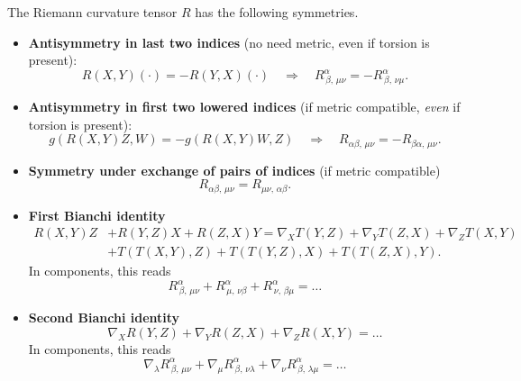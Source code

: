 \begin{mytheorem}
The Riemann curvature tensor \(R\) has the following symmetries.
\begin{itemize}
    \item \textbf{Antisymmetry in last two indices} (no need metric, even if torsion is present):
    \begin{equation}
        R(X,Y)(\cdot) = - R(Y,X)(\cdot) \quad \Longrightarrow \quad
        R^\alpha_{\,\beta,\, \mu\nu} = - R^\alpha_{\,\beta,\, \nu\mu}.
    \end{equation}
    \item \textbf{Antisymmetry in first two lowered indices} (if metric compatible, \emph{even} if torsion is present):
    \begin{equation}
        g(R(X,Y)Z,W) = - g(R(X,Y)W,Z) \quad \Longrightarrow \quad
        R_{\alpha \beta,\, \mu\nu} = - R_{\beta \alpha,\, \mu\nu}.
    \end{equation}
    \item \textbf{Symmetry under exchange of pairs of indices} (if metric compatible) 
    \begin{equation}
        R_{\alpha \beta,\, \mu\nu} = R_{\mu \nu,\, \alpha \beta}.
    \end{equation}
    \item \textbf{First Bianchi identity}
    \begin{align}
        R(X,Y)Z& + R(Y,Z)X + R(Z,X)Y = \nabla_X T(Y,Z) + \nabla_Y T(Z,X) + \nabla_Z T(X,Y) \\
        & + T(T(X,Y),Z) + T(T(Y,Z),X) + T(T(Z,X),Y).
    \end{align}
    In components, this reads
    \begin{equation}       
        R^\alpha_{\,\beta,\, \mu\nu} + R^\alpha_{\,\mu,\, \nu\beta} + R^\alpha_{\,\nu,\, \beta\mu} = \dots
    \end{equation}
    \item \textbf{Second Bianchi identity}
    \begin{equation}
        \nabla_X R(Y,Z) + \nabla_Y R(Z,X) + \nabla_Z R(X,Y) = \dots
    \end{equation}
    In components, this reads
    \begin{equation}
        \nabla_\lambda R^\alpha_{\,\beta,\, \mu\nu} + \nabla_\mu R^\alpha_{\,\beta,\, \nu\lambda} + \nabla_\nu R^\alpha_{\,\beta,\, \lambda\mu} = \dots
    \end{equation}
\end{itemize}
    
\end{mytheorem}
